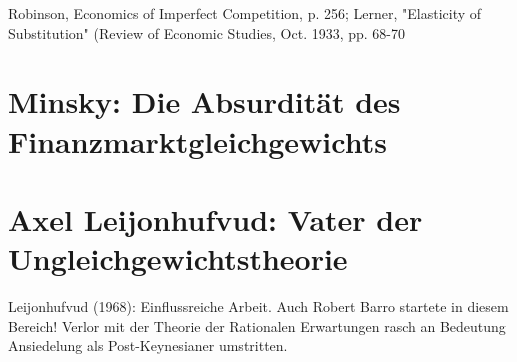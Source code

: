 Robinson, Economics of Imperfect Competition, p. 256; Lerner, "Elasticity of Substitution" (Review of Economic Studies, Oct. 1933, pp. 68-70

\section{Minsky: Die Absurdität des Finanzmarktgleichgewichts}

\section{Axel Leijonhufvud: Vater der Ungleichgewichtstheorie}

Leijonhufvud (1968): Einflussreiche Arbeit. Auch Robert Barro startete in diesem Bereich!
Verlor mit der Theorie der Rationalen Erwartungen rasch an Bedeutung
Ansiedelung als Post-Keynesianer umstritten.




